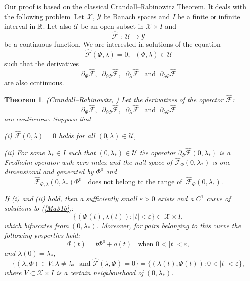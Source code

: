 \documentclass[a4paper,reqno,12pt]{amsart}
\theoremstyle{plain}
\newtheorem{theorem}{Theorem}[section]
\theoremstyle{definition}
\numberwithin{equation}{section}
\begin{document}
Our proof is based on the classical Crandall--Rabinowitz Theorem. It deals with the following problem. Let ${\mathcal X}$, ${\mathcal Y}$ be Banach spaces and  $I$ be a finite or infinite interval in $\Bbb R$. Let also ${\mathcal U}$ be an open subset in ${\mathcal X}\times I$ and
\begin{equation}\label{Ma12a}
\widehat{\mathcal F}\; :\; {\mathcal U} \rightarrow {\mathcal Y}
\end{equation}
be a continuous function. We are interested in solutions of the equation
\begin{equation}\label{Ma31b}
\widehat{\mathcal F}(\Phi,\lambda)=0,\;\;(\Phi,\lambda)\in {\mathcal U}
\end{equation}
such that the derivatives
\begin{equation}\label{Ma12aa}
\partial_\Phi \widehat{\mathcal F},\;\;\partial_{\Phi\Phi}\widehat{\mathcal F},\;\; \partial_\lambda\widehat{\mathcal F}\;\;\mbox{ and}\;\; \partial_{\lambda\Phi}\widehat{\mathcal F}
\end{equation}
 are also continuous.

\begin{theorem}\label{TA17aaz}(Crandall--Rabinowitz, \cite{CR}) Let the derivatives of the operator $\widehat{\mathcal F}$:
\begin{equation}\label{Ma12aaz}
\partial_\Phi \widehat{\mathcal F},\;\;\partial_{\Phi\Phi}\widehat{\mathcal F},\;\; \partial_\lambda\widehat{\mathcal F}\;\;\mbox{ and}\;\; \partial_{\lambda\Phi}\widehat{\mathcal F}
\end{equation}
 are continuous. Suppose that

(i)  $\widehat{\mathcal F}(0,\lambda) = 0$ holds for all $(0,\lambda)\in {\mathcal U}$,


(ii) For some $\lambda_*\in I$ such that $(0,\lambda_*)\in {\mathcal U}$ the operator
$\partial_\Phi\widehat{\mathcal F}(0,\lambda_*)$ is a Fredholm operator with zero index and the null-space of $\widehat{\mathcal F}_\Phi(0,\lambda_*)$ is
one-dimensional and generated by $\Phi^0$ and
\begin{equation}\label{Ma12b}
\widehat{\mathcal F}_{\Phi,\lambda}(0,\lambda_*)\Phi^0\;\;\mbox{ does
not belong to the range of}\;\; \widehat{\mathcal F}_\Phi(0,\lambda_*).
\end{equation}

If (i) and (ii) hold, then a sufficiently small $\varepsilon > 0$ exists and a $C^1$ curve of solutions to (\ref{Ma31b}):
$$
\{(\Phi(t),\lambda(t)) : |t| <\varepsilon\} \subset  {\mathcal X}\times I,
$$
which bifurcates from $(0,\lambda_*)$. Moreover, for pairs belonging to this curve the following properties hold:
$$
\Phi(t) = t\Phi^0 + o(t)\;\;\mbox{ when $0 < |t| < \varepsilon$},
$$
and $\lambda(0)=\lambda_*$,
$$
\{(\lambda,\Phi) \in V : \lambda\neq \lambda_*\;\mbox{ and}\; \widehat{\mathcal F}(\lambda,\Phi) = 0\} = \{(\lambda(t),\Phi(t)) : 0 < |t| < \varepsilon\},
$$
where
$V \subset {\mathcal X} \times I$ is a certain neighbourhood of $(0,\lambda_*)$.
\end{theorem}
\end{document}
